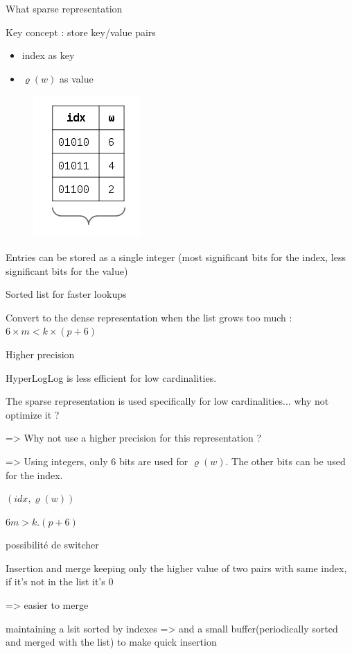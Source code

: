 \documentclass{beamer}
\begin{document}
\begin{frame}{What sparse representation}

Key concept : store key/value pairs
\begin{itemize}
\item index as key
\item $\varrho(w)$ as value
\end{itemize}

\begin{figure}[c]
\includegraphics [scale=0.5]  {hyperloglog_list.png}
\end{figure}

Entries can be stored as a single integer (most significant bits for the index, less significant bits for the value)

Sorted list for faster lookups

Convert to the dense representation when the list grows too much : $6\times m < k\times (p + 6)$


\end{frame}


\begin{frame}{Higher precision}

HyperLogLog is less efficient for low cardinalities. 

The sparse representation is used specifically for low cardinalities... why not optimize it ?

=> Why not use a higher precision for this representation ?

=> Using integers, only 6 bits are used for $\varrho(w)$. The other bits can be used for the index. 




$(idx, \varrho(w))$


$6m > k.(p + 6)$

possibilité de switcher
\end{frame}


\begin{frame}{Insertion and merge}
  keeping only the higher value of two pairs with same index, if it's
  not in the list it's 0

  => easier to merge

  maintaining a lsit sorted by indexes
  => and a small buffer(periodically sorted and merged with the list) to make quick insertion

\end{frame}
\end{document}
